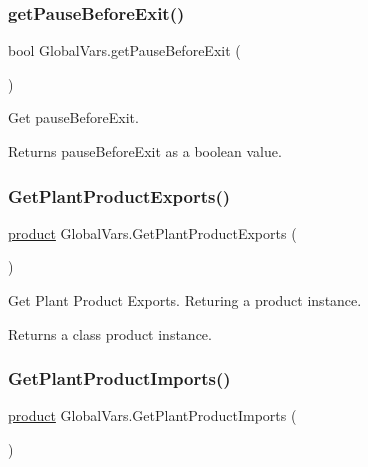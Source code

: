 \subsubsection{\texorpdfstring{getPauseBeforeExit()}{getPauseBeforeExit()}}
{\footnotesize\ttfamily bool Global\+Vars.\+get\+Pause\+Before\+Exit (\begin{DoxyParamCaption}{ }\end{DoxyParamCaption})\hspace{0.3cm}{\ttfamily [inline]}}



Get pause\+Before\+Exit. 

\begin{DoxyReturn}{Returns}
pause\+Before\+Exit as a boolean value. 
\end{DoxyReturn}
\mbox{\label{class_global_vars_a97b9869100615c2e3b3fc5c48e10080f}} 
\subsubsection{\texorpdfstring{GetPlantProductExports()}{GetPlantProductExports()}}
{\footnotesize\ttfamily \mbox{\hyperlink{class_global_vars_1_1product}{product}} Global\+Vars.\+Get\+Plant\+Product\+Exports (\begin{DoxyParamCaption}{ }\end{DoxyParamCaption})\hspace{0.3cm}{\ttfamily [inline]}}



Get Plant Product Exports. Returing a product instance. 

\begin{DoxyReturn}{Returns}
a class product instance. 
\end{DoxyReturn}
\mbox{\label{class_global_vars_a460ab7fc30f0bfd0ac2f70da9773c661}} 
\subsubsection{\texorpdfstring{GetPlantProductImports()}{GetPlantProductImports()}}
{\footnotesize\ttfamily \mbox{\hyperlink{class_global_vars_1_1product}{product}} Global\+Vars.\+Get\+Plant\+Product\+Imports (\begin{DoxyParamCaption}{ }\end{DoxyParamCaption})\hspace{0.3cm}{\ttfamily [inline]}}



